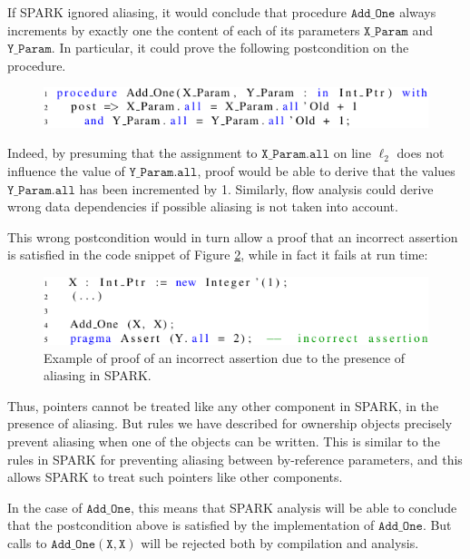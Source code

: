 \documentclass{llncs}
\newcommand\var[1]{\ensuremath{\mathtt{#1}}}
\begin{document}
If SPARK ignored aliasing, it would conclude that procedure \var{Add\_One} always increments by exactly one the content of each of its parameters \var{X\_Param} and \var{Y\_Param}.
In particular, it could prove the following postcondition on the procedure.

\begin{figure}[htb!]
\centering
  \captionsetup{justification=centering,margin=0.6cm}
   \includegraphics[]{spark_ex1_proof}
   \label{fig:spark_ex1_proof}
\end{figure}

Indeed, by presuming that the assignment to \var{X\_Param.all} on line $\ell_2$ does not influence the value of \var{Y\_Param.all}, proof would be able to
derive that the values \var{Y\_Param.all} has been incremented by 1. Similarly, flow analysis could derive wrong data dependencies if possible aliasing is not taken into account.

This wrong postcondition would in turn allow a proof that an incorrect assertion is satisfied in the code snippet of Figure \ref{fig:spark_ex1_exp}, while in fact it fails at run time:

\begin{figure}[htb!]
\centering
  \captionsetup{justification=centering,margin=0.6cm}
   \includegraphics[]{spark_ex1_exp}
	\caption{Example of proof of an incorrect assertion due to the presence of aliasing in SPARK.}
   \label{fig:spark_ex1_exp}
\end{figure}

Thus, pointers cannot be treated like any other component in SPARK, in the presence of aliasing. But rules we have described for ownership objects precisely prevent
aliasing when one of the objects can be written. This is similar to the rules in SPARK for preventing aliasing between by-reference parameters, and this allows SPARK to treat such pointers
like other components.

In the case of \var{Add\_One}, this means that SPARK analysis will be able to conclude that the postcondition above is satisfied by the implementation of \var{Add\_One}.
But calls to \var{Add\_One(X,X)} will be rejected both by compilation and analysis.
\end{document}
